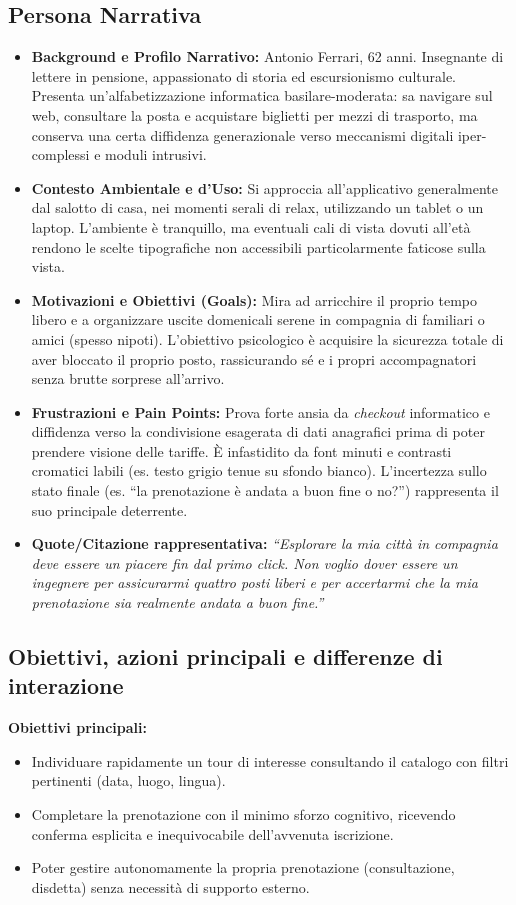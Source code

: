 \subsection{Persona Narrativa}
\begin{itemize}
    \item \textbf{Background e Profilo Narrativo:} Antonio Ferrari, 62 anni. Insegnante di lettere in pensione, appassionato di storia ed escursionismo culturale. Presenta un'alfabetizzazione informatica basilare-moderata: sa navigare sul web, consultare la posta e acquistare biglietti per mezzi di trasporto, ma conserva una certa diffidenza generazionale verso meccanismi digitali iper-complessi e moduli intrusivi.
    \item \textbf{Contesto Ambientale e d'Uso:} Si approccia all'applicativo generalmente dal salotto di casa, nei momenti serali di relax, utilizzando un tablet o un laptop. L'ambiente è tranquillo, ma eventuali cali di vista dovuti all'età rendono le scelte tipografiche non accessibili particolarmente faticose sulla vista.
    \item \textbf{Motivazioni e Obiettivi (Goals):} Mira ad arricchire il proprio tempo libero e a organizzare uscite domenicali serene in compagnia di familiari o amici (spesso nipoti). L'obiettivo psicologico è acquisire la sicurezza totale di aver bloccato il proprio posto, rassicurando sé e i propri accompagnatori senza brutte sorprese all'arrivo.
    \item \textbf{Frustrazioni e Pain Points:} Prova forte ansia da \textit{checkout} informatico e diffidenza verso la condivisione esagerata di dati anagrafici prima di poter prendere visione delle tariffe. È infastidito da font minuti e contrasti cromatici labili (es. testo grigio tenue su sfondo bianco). L'incertezza sullo stato finale (es. ``la prenotazione è andata a buon fine o no?'') rappresenta il suo principale deterrente.
    \item \textbf{Quote/Citazione rappresentativa:} \textit{``Esplorare la mia città in compagnia deve essere un piacere fin dal primo click. Non voglio dover essere un ingegnere per assicurarmi quattro posti liberi e per accertarmi che la mia prenotazione sia realmente andata a buon fine.''}
\end{itemize}

\subsection{Obiettivi, azioni principali e differenze di interazione}
\textbf{Obiettivi principali:}
\begin{itemize}
    \item Individuare rapidamente un tour di interesse consultando il catalogo con filtri pertinenti (data, luogo, lingua).
    \item Completare la prenotazione con il minimo sforzo cognitivo, ricevendo conferma esplicita e inequivocabile dell'avvenuta iscrizione.
    \item Poter gestire autonomamente la propria prenotazione (consultazione, disdetta) senza necessità di supporto esterno.
\end{itemize}

